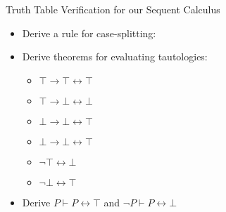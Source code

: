 \documentclass[presentation]{beamer}
\begin{document}
\begin{frame}[label={sec:orgheadline29}]{Truth Table Verification for our Sequent Calculus}
\begin{itemize}
\item Derive a rule for case-splitting:
\end{itemize}

\begin{prooftree}
\end{prooftree}

\begin{itemize}
\item Derive theorems for evaluating tautologies:
\begin{itemize}
\item \(\top \rightarrow \top \leftrightarrow \top\)
\item \(\top \rightarrow \bot \leftrightarrow \bot\)
\item \(\bot \rightarrow \bot \leftrightarrow \top\)
\item \(\bot \rightarrow \bot \leftrightarrow \top\)
\item \(\neg\top \leftrightarrow \bot\)
\item \(\neg\bot \leftrightarrow \top\)
\end{itemize}

\item Derive
\(P \vdash P \leftrightarrow \top\) and \(\neg P \vdash P \leftrightarrow \bot\)
\end{itemize}
\end{frame}
\end{document}
